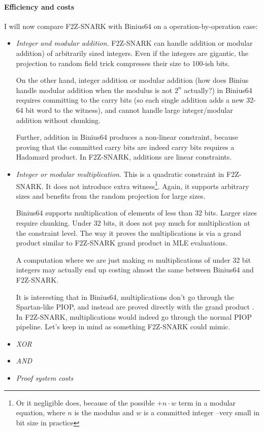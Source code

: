 \documentclass[11pt,letterpaper,usenames,dvipsnames]{article}
\begin{document}
\paragraph{Efficiency and costs}
I will now compare F2Z-SNARK with Binius64 on a operation-by-operation case:
\begin{itemize}
    \item \emph{Integer and modular addition.} F2Z-SNARK can handle addition or modular addition) of arbitrarily sized integers. Even if the integers are gigantic, the projection to random field trick compresses their size to 100-ish bits. 

    On the other hand, integer addition or modular addition (how does Binius handle modular addition when the modulus is not $2^n$ actually?) in Binius64 requires committing to the carry bits (so each single addition adds a new 32-64 bit word to the witness), and cannot handle large integer/modular addition without chunking.  

    Further, addition in Binius64 produces a non-linear constraint, because proving that the committed carry bits are indeed carry bits requires a Hadamard product. In F2Z-SNARK, additions are linear constraints.
    \item \emph{Integer or modular multiplication}. This is a quadratic constraint in F2Z-SNARK. It does not introduce extra witness\footnote{Or it negligible does, because of the possible $+n\cdot w$ term in a modular equation, where $n$ is the modulus and $w$ is a committed integer --very small in bit size in practice}. Again, it supports arbitrary sizes and benefits from the random projection for large sizes. 

    Binius64 supports multiplication of elements of less than 32 bits. Larger sizes require chunking. Under 32 bits, it does not pay much for multiplication at the constraint level. The way it proves the multiplications is via a grand product similar to F2Z-SNARK grand product in MLE evaluations. 

    A computation where we are just making $m$ multiplications of under 32 bit integers may actually end up costing almost the same between Binius64 and F2Z-SNARK. 

    It is interesting that in Binius64, multiplications don't go through the Spartan-like PIOP, and instead are proved directly with the grand product .  In F2Z-SNARK, multiplications would indeed go through the normal PIOP pipeline. Let's keep in mind as something F2Z-SNARK could mimic. 
    \item \emph{XOR}
    \item \emph{AND}
    \item \emph{Proof system costs}
\end{itemize}
\end{document}

